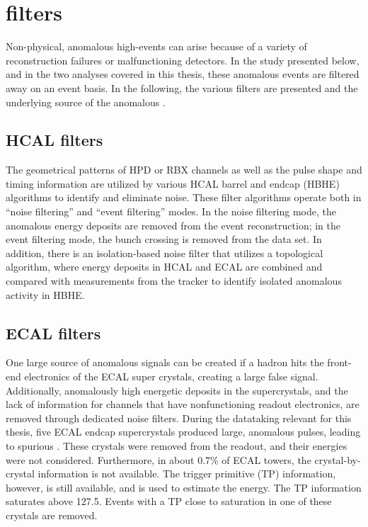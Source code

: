 \section{\ptmiss filters}                                                                                                                                     
\label{sec:filters}
Non-physical, anomalous high-\ptmiss events can arise because of a variety of reconstruction failures or malfunctioning detectors.  
In the \ptmiss study presented below, and in the two analyses covered in this thesis, these anomalous \ptmiss events are filtered away on an event basis. 
In the following, the various filters are presented and the underlying source of the anomalous \ptmiss. 
\subsection{HCAL filters}
The geometrical patterns of HPD or RBX channels as well as the pulse shape and timing information are utilized by various HCAL barrel and endcap (HBHE) algorithms to identify and eliminate noise. 
These filter algorithms operate both in ``noise filtering'' and ``event filtering'' modes.
In the noise filtering mode, the anomalous energy deposits are removed from the event reconstruction; in the event filtering mode, the bunch crossing is removed from the data set. 
In addition, there is an isolation-based noise filter that utilizes a topological algorithm, where energy deposits in HCAL and ECAL are combined
and compared with measurements from the tracker to identify isolated anomalous activity in HBHE. 
\subsection{ECAL filters}
One large source of anomalous \ptmiss signals can be created if a hadron hits the front-end electronics of the ECAL super crystals, creating a large false signal.  
Additionally, anomalously high energetic deposits in the supercrystals, and the lack of information for channels that have nonfunctioning readout electronics, are removed through dedicated noise filters.
During the datataking relevant for this thesis, five ECAL endcap supercrystals produced large, anomalous pulses, leading to spurious \ptmiss. 
These crystals were removed from the readout, and their energies were not considered.
Furthermore, in about 0.7\% of ECAL towers, the crystal-by-crystal information is not available. 
The trigger primitive (TP) information, however, is still available, and is used to estimate the energy. 
The TP information saturates above 127.5\GeV. Events with a TP close to saturation in one of these crystals are removed.
